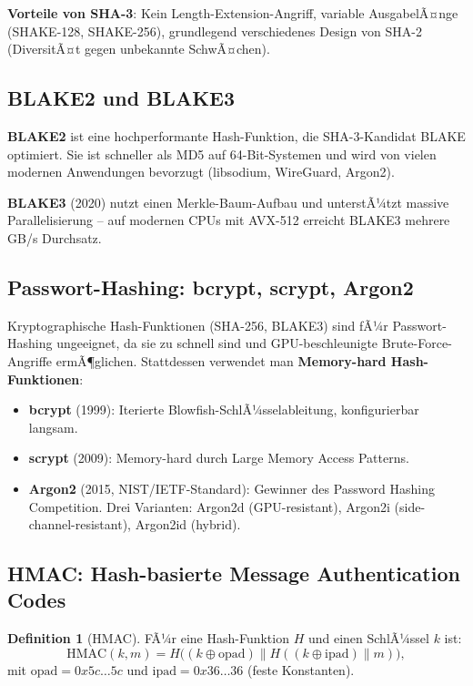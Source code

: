 ﻿\documentclass[a4paper,12pt]{scrreprt}
\theoremstyle{definition}
\newtheorem{definition}{Definition}[section]
\begin{document}
\textbf{Vorteile von SHA-3}: Kein Length-Extension-Angriff, variable AusgabelÃ¤nge (SHAKE-128, SHAKE-256), grundlegend verschiedenes Design von SHA-2 (DiversitÃ¤t gegen unbekannte SchwÃ¤chen).

\subsection{BLAKE2 und BLAKE3}

\textbf{BLAKE2} ist eine hochperformante Hash-Funktion, die SHA-3-Kandidat BLAKE optimiert. Sie ist schneller als MD5 auf 64-Bit-Systemen und wird von vielen modernen Anwendungen bevorzugt (libsodium, WireGuard, Argon2).

\textbf{BLAKE3} (2020) nutzt einen Merkle-Baum-Aufbau und unterstÃ¼tzt massive Parallelisierung -- auf modernen CPUs mit AVX-512 erreicht BLAKE3 mehrere GB/s Durchsatz.

\subsection{Passwort-Hashing: bcrypt, scrypt, Argon2}

Kryptographische Hash-Funktionen (SHA-256, BLAKE3) sind fÃ¼r Passwort-Hashing ungeeignet, da sie zu schnell sind und GPU-beschleunigte Brute-Force-Angriffe ermÃ¶glichen. Stattdessen verwendet man \textbf{Memory-hard Hash-Funktionen}:

\begin{itemize}
    \item \textbf{bcrypt} (1999): Iterierte Blowfish-SchlÃ¼sselableitung, konfigurierbar langsam.
    \item \textbf{scrypt} (2009): Memory-hard durch Large Memory Access Patterns.
    \item \textbf{Argon2} (2015, NIST/IETF-Standard): Gewinner des Password Hashing Competition. Drei Varianten: Argon2d (GPU-resistant), Argon2i (side-channel-resistant), Argon2id (hybrid).
\end{itemize}

\subsection{HMAC: Hash-basierte Message Authentication Codes}

\begin{definition}[HMAC]
FÃ¼r eine Hash-Funktion $H$ und einen SchlÃ¼ssel $k$ ist:
\[
\mathrm{HMAC}(k, m) = H\bigl((k \oplus \mathrm{opad}) \| H((k \oplus \mathrm{ipad}) \| m)\bigr),
\]
mit $\mathrm{opad} = 0x5c\ldots5c$ und $\mathrm{ipad} = 0x36\ldots36$ (feste Konstanten).
\end{definition}
\end{document}
